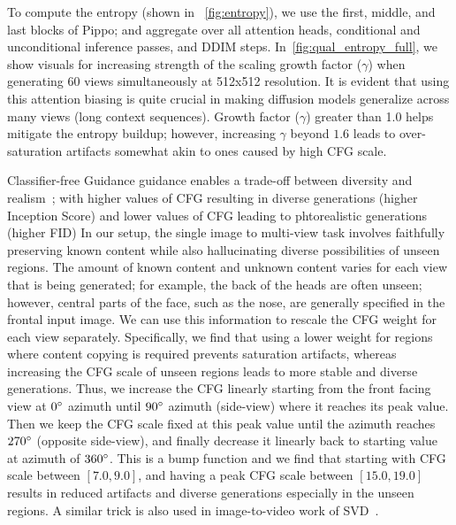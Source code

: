 

 To compute the entropy (shown in ~\cref{fig:entropy}), we use the first, middle, and last blocks of Pippo; and aggregate over all attention heads, conditional and unconditional inference passes, and DDIM steps. In~\cref{fig:qual_entropy_full}, we show visuals for increasing strength of the scaling growth factor ($\gamma$) when generating 60 views simultaneously at 512x512 resolution. It is evident that using this attention biasing is quite crucial in making diffusion models generalize across many views (long context sequences). Growth factor ($\gamma$) greater than 1.0 helps mitigate the entropy buildup; however, increasing $\gamma$ beyond $1.6$ leads to over-saturation artifacts somewhat akin to ones caused by high CFG scale. 


Classifier-free Guidance guidance enables a trade-off between diversity and realism~\cite{ho2022classifierfree}; with higher values of CFG resulting in diverse generations (\ie higher Inception Score) and lower values of CFG leading to phtorealistic generations (\ie higher FID)
In our setup, the single image to multi-view task involves faithfully preserving known content while also hallucinating diverse possibilities of unseen regions. The amount of known content and unknown content varies for each view that is being generated; for example, the back of the heads are often unseen; however, central parts of the face, such as the nose, are generally specified in the frontal input image. 
We can use this information to rescale the CFG weight for each view separately.
Specifically, we find that using a lower weight for regions where content copying is required prevents saturation artifacts, whereas increasing the CFG scale of unseen regions leads to more stable and diverse generations. 
Thus, we increase the CFG linearly starting from the front facing view at $0^{\circ}$ azimuth until $90^{\circ}$ azimuth (side-view) where it reaches its peak value. Then we keep the CFG scale fixed at this peak value until the azimuth reaches $270^{\circ}$ (opposite side-view), and finally decrease it linearly back to starting value at azimuth of $360^{\circ}$. This is a bump function and we find that starting with CFG scale between $[7.0, 9.0]$, and having a peak CFG scale between $[15.0,19.0]$ results in reduced artifacts and diverse generations especially in the unseen regions. A similar trick is also used in image-to-video work of SVD~\cite{blattmann2023stable}. 

